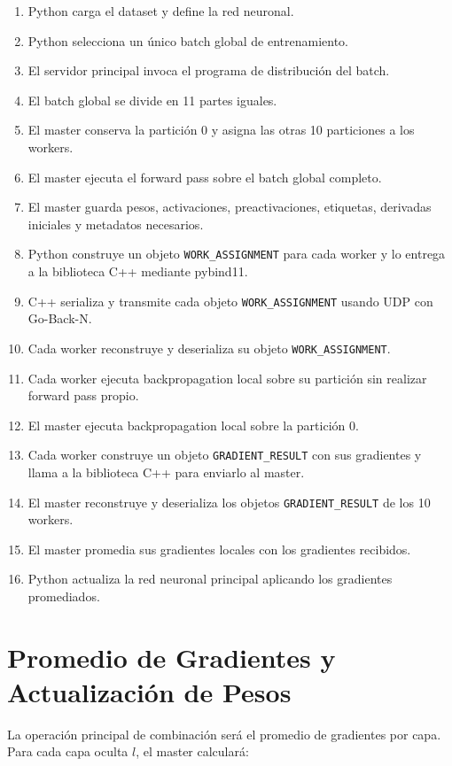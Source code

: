\documentclass[12pt]{article}
\begin{document}
\begin{enumerate}

\item Python carga el dataset y define la red neuronal.
\item Python selecciona un único batch global de entrenamiento.
\item El servidor principal invoca el programa de distribución del batch.
\item El batch global se divide en 11 partes iguales.
\item El master conserva la partición 0 y asigna las otras 10 particiones a los workers.
\item El master ejecuta el forward pass sobre el batch global completo.
\item El master guarda pesos, activaciones, preactivaciones, etiquetas, derivadas iniciales y metadatos necesarios.
\item Python construye un objeto \texttt{WORK\_ASSIGNMENT} para cada worker y lo entrega a la biblioteca C++ mediante pybind11.
\item C++ serializa y transmite cada objeto \texttt{WORK\_ASSIGNMENT} usando UDP con Go-Back-N.
\item Cada worker reconstruye y deserializa su objeto \texttt{WORK\_ASSIGNMENT}.
\item Cada worker ejecuta backpropagation local sobre su partición sin realizar forward pass propio.
\item El master ejecuta backpropagation local sobre la partición 0.
\item Cada worker construye un objeto \texttt{GRADIENT\_RESULT} con sus gradientes y llama a la biblioteca C++ para enviarlo al master.
\item El master reconstruye y deserializa los objetos \texttt{GRADIENT\_RESULT} de los 10 workers.
\item El master promedia sus gradientes locales con los gradientes recibidos.
\item Python actualiza la red neuronal principal aplicando los gradientes promediados.

\end{enumerate}

\section{Promedio de Gradientes y Actualización de Pesos}

La operación principal de combinación será el promedio de gradientes por capa. Para cada capa oculta $l$, el master calculará:
\end{document}

